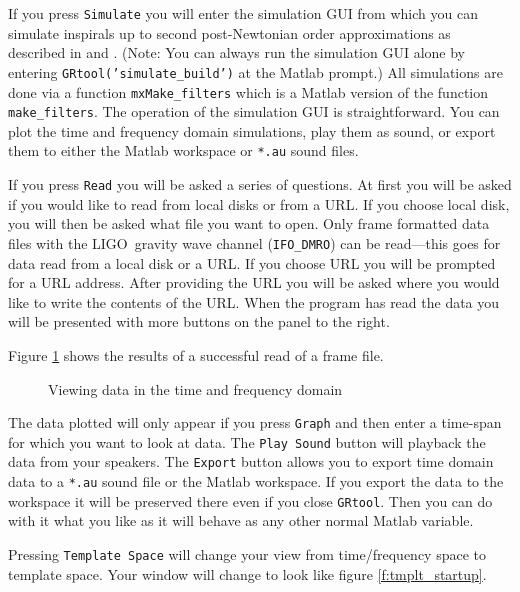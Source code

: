 If you press \texttt{Simulate} you will enter the simulation GUI from
which you can simulate inspirals up to second post-Newtonian order
approximations as described in \cite{biww} and \cite{willwiseman}.
(Note: You
can always run the simulation GUI alone by entering
\texttt{GRtool('simulate\_build')} at the Matlab prompt.)
 All simulations
are done via a function \texttt{mxMake\_filters} which is a Matlab version of the
function \texttt{make\_filters}. The operation of the simulation GUI is
straightforward. You can plot the time and frequency domain simulations, play
them as sound, or export them to either the Matlab workspace or 
\texttt{*.au} sound files.

If you press \texttt{Read} you will be asked a series of questions. At first
you will be asked if you would like to read from local disks or from a URL. If
you choose local disk, you will then be asked what file you want to open. Only
frame formatted data files with the LIGO\ gravity wave channel
(\texttt{IFO\_DMRO}) can be read---this goes for data read from a local disk
or a URL. If you choose URL you will be prompted for a URL address. After
providing the URL you will be asked where you would like to write the contents
of the URL. When the program has read the data you will be presented with more
buttons on the panel to the right.

Figure \ref{f:tfspace} shows the results of a successful read of a frame file.
\begin{figure}[h]
\begin{center}
\caption{ \label{f:tfspace}
Viewing data in the time and frequency domain}
\end{center}
\end{figure}
The data plotted will only appear if you press \texttt{Graph} and then
enter a time-span for which you want to look at data. The \texttt{Play Sound} button
will playback the data from your speakers. The \texttt{Export} button
allows you to export time domain data to a \texttt{*.au} sound file or
the Matlab workspace. If you export the data to the workspace it will be
preserved there even if you close \texttt{GRtool}. Then you can do with
it what you like as it will behave as any other normal Matlab variable.

Pressing \texttt{Template Space} will change your view from time/frequency
space to template space. Your window will change to look like figure
\ref{f:tmplt_startup}.

